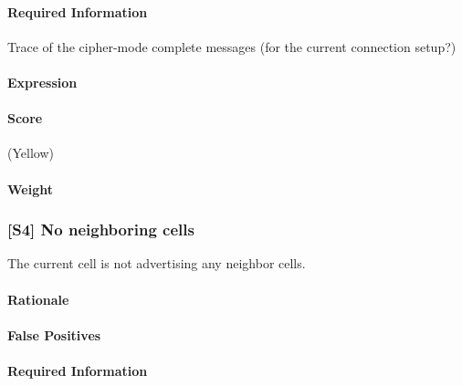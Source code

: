 \documentclass[a4paper,11pt,notitlepage,bigheadings,oneside]{scrartcl}
\begin{document}
\TBD


\paragraph{Required Information}

\TBD

Trace of the cipher-mode complete messages (for the current connection setup?)

\paragraph{Expression}

\TBD

\paragraph{Score}

\TBD{} (Yellow)

\paragraph{Weight}

\TBD{}

\subsubsection{[S4] No neighboring cells}

The current cell is not advertising any neighbor cells.

\paragraph{Rationale}

\TBD{}

\paragraph{False Positives}

\TBD{}


\paragraph{Required Information}
\end{document}
